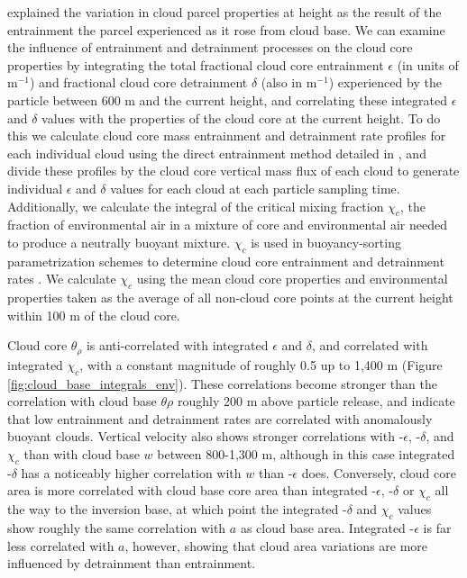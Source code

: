 \documentclass[acp]{copernicus}
\begin{document}
\cite{Romps2010} explained the variation in cloud parcel properties at height 
as the result of the entrainment the parcel experienced as it rose from 
cloud base.  We can examine the influence of entrainment and detrainment 
processes on the cloud core properties by integrating the total fractional 
cloud core entrainment $\epsilon$ (in units of m$^{-1}$) and fractional cloud 
core detrainment $\delta$ (also in m$^{-1}$) experienced by the particle 
between 600 m and the current height, and correlating these integrated 
$\epsilon$ and $\delta$ values with the properties of the cloud core at the 
current height.  To do this we calculate cloud core mass entrainment and 
detrainment rate profiles for each individual cloud using the direct 
entrainment method detailed in \cite{Dawe2011}, and divide these profiles by 
the cloud core vertical mass flux of each cloud to generate individual 
$\epsilon$ and $\delta$ values for each cloud at each particle sampling time.
Additionally, we calculate the integral of the critical mixing fraction 
$\chi_c$, the fraction of environmental air in a mixture of core and 
environmental air needed to produce a neutrally buoyant mixture.  $\chi_c$ is 
used in buoyancy-sorting parametrization schemes to determine cloud core 
entrainment and detrainment rates \citep{Kain1990, Rooy2008}.  We calculate 
$\chi_c$ using the mean cloud core properties and environmental properties 
taken as the average of all non-cloud core points at the current height within 
100 m of the cloud core.

Cloud core $\theta_\rho$ is anti-correlated with integrated $\epsilon$ and 
$\delta$, and correlated with integrated $\chi_c$, with a constant magnitude 
of roughly 0.5 up to 1,400 m (Figure \ref{fig:cloud_base_integrals_env}). 
These correlations become stronger than the correlation with cloud base 
$\theta\rho$ roughly 200 m above particle release, and indicate that low 
entrainment and detrainment rates are correlated with anomalously buoyant 
clouds.  Vertical velocity also shows stronger correlations with -$\epsilon$, 
-$\delta$, and $\chi_c$ than with cloud base $w$ between 800-1,300 m, 
although in this case integrated -$\delta$ has a noticeably higher correlation 
with $w$ than -$\epsilon$ does.  Conversely, cloud core area is more 
correlated with cloud base core area than integrated -$\epsilon$, -$\delta$ 
or $\chi_c$ all the way to the inversion base, at which point the integrated 
-$\delta$ and $\chi_c$ values show roughly the same correlation with $a$ as 
cloud base area.  Integrated -$\epsilon$ is far less correlated with $a$, 
however, showing that cloud area variations are more influenced by detrainment 
than entrainment.
\end{document}
